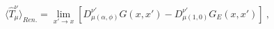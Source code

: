 \begin{equation}
\langle\hat{T}_\mu^\nu\rangle_{Ren.}=\lim_{x'\to x}[D_{\mu(\alpha,\phi)}^{\nu'}
G(x,x')-D_{\mu(1,0)}^{\nu'}G_{E}(x,x')] \ ,
\label{45}
\end{equation}

